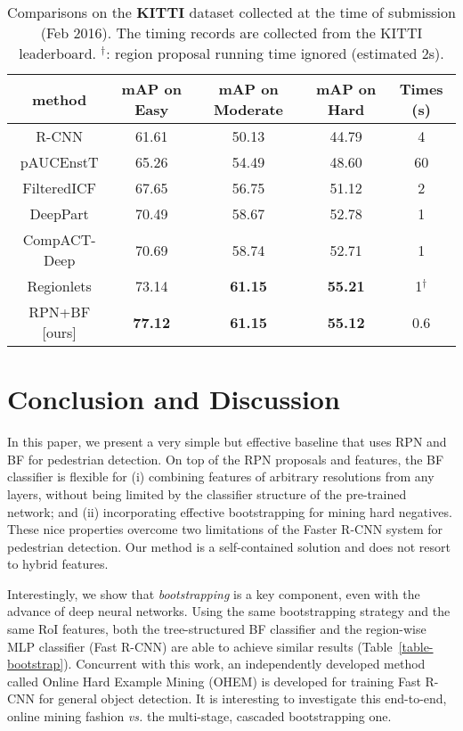 \documentclass[runningheads]{llncs}
\def\vs{\emph{vs. }}
\begin{document}
\begin{table}[t]
\begin{center}
\begin{tabular}{c|c|c|c|c}
\hline
method & mAP  on Easy &  mAP on  Moderate & mAP on  Hard & Times (s) \\
\hline\hline
R-CNN & 61.61 & 50.13 & 44.79 & 4 \\
pAUCEnstT & 65.26 & 54.49 & 48.60 & 60 \\
FilteredICF & 67.65 & 56.75 & 51.12 & 2 \\
DeepPart & 70.49 & 58.67 & 52.78 & 1 \\
CompACT-Deep & 70.69 & 58.74 & 52.71 & 1 \\
Regionlets & 73.14 & \textbf{61.15} & \textbf{55.21} & 1$^\dag$ \\
\hline
RPN+BF [ours]  & \textbf{77.12} & \textbf{61.15} & \textbf{55.12} & 0.6 \\
\hline
\end{tabular}
\end{center}
\caption{Comparisons on the \textbf{KITTI} dataset collected at the time of submission (Feb 2016). The timing records are collected from the KITTI leaderboard. $^\dag$: region proposal running time ignored (estimated 2s).}
\label{table-kitti}
\end{table}


\section{Conclusion and Discussion}

In this paper, we present a very simple but effective baseline that uses RPN and BF for pedestrian detection. On top of the RPN proposals and features, the BF classifier is flexible for (i) combining features of arbitrary resolutions from any layers, without being limited by the classifier structure of the pre-trained network; and (ii) incorporating effective bootstrapping for mining hard negatives. These nice properties overcome two limitations of the Faster R-CNN system for pedestrian detection. Our method is a self-contained solution and does not resort to hybrid features.

Interestingly, we show that \emph{bootstrapping} is a key component, even with the advance of deep neural networks. Using the same bootstrapping strategy and the same RoI features, both the tree-structured BF classifier and the region-wise MLP classifier (Fast R-CNN) are able to achieve similar results (Table~\ref{table-bootstrap}).
Concurrent with this work, an independently developed method called Online Hard Example Mining (OHEM) \cite{shrivastava2016training} is developed for training Fast R-CNN for general object detection. It is interesting to investigate this end-to-end, online mining fashion \vs the multi-stage, cascaded bootstrapping one.
\end{document}
